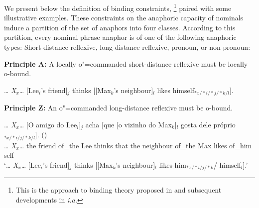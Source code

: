 \documentclass[output=paper
,modfonts
,nonflat]{langsci/langscibook}
\begin{document}
We present below the definition of binding constraints,%
\footnote{
This is the approach
to binding theory proposed in \citep[Chap.6]{polsag:hpsg94} and subsequent developments in
\citep{xue:ziji94,branco:branch96,brancoMarrafa:subject97, manningSag:1999, wechsler:1999, 
koenig:equa99, branco:ldrefl99, richter:quant99, golde:diss99, branco:livro00, kiss:2001, branco:2002a, branco:2002b, branco:2002c} \emph{i.a.}}
paired with some illustrative examples.
These constraints on the anaphoric capacity of nominals induce a partition of the set of anaphors
into four classes. According to this partition, every nominal phrase anaphor is of one of the
following anaphoric types: Short-distance reflexive, long-distance reflexive, pronoun,
or non-pronoun:

%
	

\begin{exe}
\label{bindingPrinciples}
\ex
{\textbf{Principle A:}} A locally o"=commanded short-distance
reflexive must be \mbox{locally} o-bound.

\sn
{\ldots{} \emph{X}$_{x}$\ldots{} [Lee$_{i}$'s friend]$_{j}$ thinks
[[Max$_{k}$'s neighbour]$_{l}$ likes \linebreak
himself$_{*x/*i/*j/*k/l}$].}
\end{exe}


\begin{exe}
\sn
{\textbf{Principle Z:}} An o"=commanded long-distance reflexive must be
o-bound.

\sn
\gll \ldots{} \emph{X}$_{x}$\ldots{} [O amigo do Lee$_{i}$]$_{j}$ acha [que [o
vizinho do Max$_{k}$]$_{l}$ gosta dele pr\'{o}prio$_{*x/*i/j/*k/l}$]. ()\\ \ldots{}
\emph{X}$_{x}$\ldots{} the friend of\_the Lee thinks that the neighbour of\_the Max likes of\_him self\\
\trans `\ldots{} \emph{X}$_{x}$\ldots{} [Lee$_{i}$'s friend]$_{j}$ thinks [[Max$_{k}$'s neighbour]$_{l}$
likes \linebreak
him$_{*x/*i/j/*k}$/ himself$_{l}$].'
\end{exe}
\end{document}
